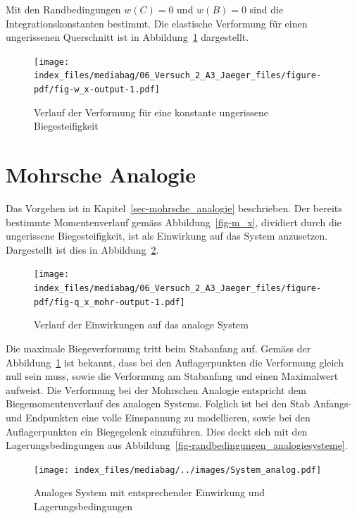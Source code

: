 \documentclass[
  letterpaper,
]{scrreprt}
\begin{document}
Mit den Randbedingungen \(w(C) = 0\) und \(w(B) = 0\) sind die
Integrationskonstanten bestimmt. Die elastische Verformung für einen
ungerissenen Querschnitt ist in Abbildung~\ref{fig-w_x} dargestellt.

\begin{figure}[H]

{\centering \texttt{[image: index\_files/mediabag/06\_Versuch\_2\_A3\_Jaeger\_files/figure-pdf/fig-w\_x-output-1.pdf]}

}

\caption{\label{fig-w_x}Verlauf der Verformung für eine konstante
ungerissene Biegesteifigkeit}

\end{figure}

\hypertarget{mohrsche-analogie}{%
\section{Mohrsche Analogie}\label{mohrsche-analogie}}

Das Vorgehen ist in Kapitel~\ref{sec-mohrsche_analogie} beschrieben. Der
bereits bestimmte Momentenverlauf gemäss Abbildung~\ref{fig-m_x},
dividiert durch die ungerissene Biegesteifigkeit, ist als Einwirkung auf
das System anzusetzen. Dargestellt ist dies in
Abbildung~\ref{fig-q_x_mohr}.

\begin{figure}[H]

{\centering \texttt{[image: index\_files/mediabag/06\_Versuch\_2\_A3\_Jaeger\_files/figure-pdf/fig-q\_x\_mohr-output-1.pdf]}

}

\caption{\label{fig-q_x_mohr}Verlauf der Einwirkungen auf das analoge
System}

\end{figure}

Die maximale Biegeverformung tritt beim Stabanfang auf. Gemäss der
Abbildung~\ref{fig-w_x} ist bekannt, dass bei den Auflagerpunkten die
Verformung gleich null sein muss, sowie die Verformung am Stabanfang und
einen Maximalwert aufweist. Die Verformung bei der Mohrschen Analogie
entspricht dem Biegemomentenverlauf des analogen Systems. Folglich ist
bei den Stab Anfangs- und Endpunkten eine volle Einspannung zu
modellieren, sowie bei den Auflagerpunkten ein Biegegelenk einzuführen.
Dies deckt sich mit den Lagerungsbedingungen aus
Abbildung~\ref{fig-randbedingungen_analogiesysteme}.

\begin{figure}[H]

{\centering \texttt{[image: index\_files/mediabag/../images/System\_analog.pdf]}

}

\caption{\label{fig-system_analog}Analoges System mit entsprechender
Einwirkung und Lagerungsbedingungen}

\end{figure}
\end{document}

